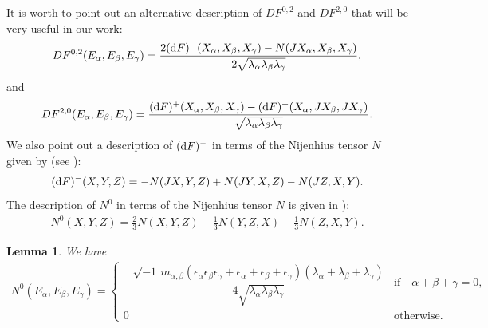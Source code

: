 \documentclass[pdftex]{sigma}%
\numberwithin{equation}{section}
\newtheorem{Lemma}[Theorem]{Lemma}
\begin{document}
\begin{Remark}
It is worth to point out an alternative description of $DF^{0,2}$ and $DF^{2,0}$ that will be very useful in our work:
\begin{gather*}
DF^{0,2}(E_{\alpha},E_{\beta},E_{\gamma})=\dfrac{2({\rm d}F)^{-}(X_{\alpha},X_{\beta},X_{\gamma}) -N(JX_{\alpha},X_{\beta},X_{\gamma})}{2\sqrt{\lambda_{\alpha}\lambda_{\beta}\lambda_{\gamma}}},
\end{gather*}
and
\begin{gather*}
DF^{2,0}(E_{\alpha},E_{\beta},E_{\gamma})=\dfrac{({\rm d}F)^{+}(X_{\alpha},X_{\beta},X_{\gamma})-({\rm d}F)^{+}(X_{\alpha},JX_{\beta},JX_{\gamma})}{\sqrt{\lambda_{\alpha}\lambda_{\beta}\lambda_{\gamma}}}.
\end{gather*}
We also point out a description of $({\rm d}F)^-$ in terms of the Nijenhius tensor $N$ given by (see \cite{gau}):
\begin{gather*}
({\rm d}F)^{-}(X,Y,Z)=-N(JX,Y,Z)+N(JY,X,Z)-N(JZ,X,Y).
\end{gather*}
The description of $N^0$ in terms of the Nijenhius tensor $N$ is given in \cite{gau}):
\begin{gather*}
N^{0}(X,Y,Z)=\frac{2}{3}N(X,Y,Z)-\frac{1}{3}N(Y,Z,X)-\frac{1}{3}N(Z,X,Y).
\end{gather*}
\end{Remark}

\begin{Lemma}
We have
\begin{gather*}
N^{0}(E_{\alpha},E_{\beta},E_{\gamma})=\begin{cases}
-\dfrac{\sqrt{-1} \, m_{\alpha,\beta} (\epsilon_{\alpha}\epsilon_{\beta}\epsilon_{\gamma} \!+\epsilon_{\alpha}\!+\epsilon_{\beta}\!+\epsilon_{\gamma}) (\lambda_{\alpha}\!+\lambda_{\beta}\!+\lambda_{\gamma})}{4 \sqrt{\lambda_{\alpha}\lambda_{\beta}\lambda_{\gamma}}}  & \text{if}\quad \alpha\!+\beta\!+\gamma = 0,
\\
0 & \text{otherwise}.
\end{cases}
\end{gather*}
\end{Lemma}
\end{document}
